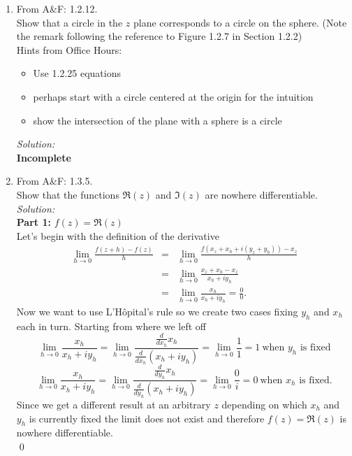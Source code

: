 \documentclass[10pt]{amsart}
\theoremstyle{nonumberplain}
\begin{document}
\mline
\begin{enumerate}[label={\bf {\arabic*}:}]
\item From A\&F: 1.2.12. \\
Show that a circle in the $z$ plane corresponds to a circle on the sphere.
(Note the remark following the reference to Figure 1.2.7 in Section 1.2.2)\\
Hints from Office Hours: \\
\begin{itemize}
\item Use 1.2.25 equations
\item perhaps start with a circle centered at the origin for the intuition
\item show the intersection of the plane with a sphere is a circle \\
\end{itemize}
\textit{Solution:} \\
\textbf{Incomplete} \\

\item From A\&F: 1.3.5.\\
Show that the functions $\Re(z)$ and $\Im(z)$ are nowhere differentiable. \\
\textit{Solution:} \\
\textbf{Part 1:} $f(z) = \Re(z)$ \\
Let's begin with the definition of the derivative 
\begin{eqnarray*}
\lim_{h \rightarrow 0} \frac{f(z + h) - f(z)}{h} &=& \lim_{h \rightarrow 0} \frac{f(x_z + x_h + i (y_z + y_h) ) - x_z}{h} \\
								 &=& \lim_{h \rightarrow 0} \frac{x_z + x_h - x_z}{x_h + iy_h} \\
								 &=& \lim_{h \rightarrow 0} \frac{x_h}{x_h + iy_h} = \frac{0}{0}.						
\end{eqnarray*}
Now we want to use L'Hôpital's rule so we create two cases fixing $y_h$ and $x_h$ each in turn.
Starting from where we left off
$$ \lim_{h \rightarrow 0} \frac{x_h}{x_h + iy_h} = \lim_{h \rightarrow 0} \frac{ \frac{d}{dx_h}x_h}{\frac{d}{dx_h}(x_h + iy_h)} = \lim_{h \rightarrow 0} \frac{1}{1} = 1 \: \text{when $y_h$ is fixed} $$
$$ \lim_{h \rightarrow 0} \frac{x_h}{x_h + iy_h} = \lim_{h \rightarrow 0} \frac{ \frac{d}{dy_h}x_h}{\frac{d}{dy_h}(x_h + iy_h)} = \lim_{h \rightarrow 0} \frac{0}{i} = 0 \: \text{when $x_h$ is fixed}. $$
Since we get a different result at an arbitrary $z$ depending on which $x_h$ and $y_h$ is currently fixed the limit does not exist and therefore $f(z) = \Re(z)$ is nowhere differentiable. \\
\qed


\end{enumerate}
\end{document}
